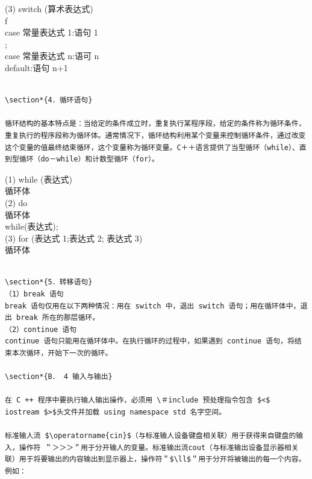 \documentclass[10pt]{article}
\begin{document}
(3) switch (算术表达式)\\
f\\
case 常量表达式 1:语句 1\\
;\\
case 常量表达式 n:语可 n\\
default:语句 n+1

\begin{verbatim}

\section*{4．循环语句}

循环结构的基本特点是：当给定的条件成立时，重复执行某程序段，给定的条件称为循环条件，重复执行的程序段称为循环体。通常情况下，循环结构利用某个变量来控制循环条件，通过改变这个变量的值最终结束循环，这个变量称为循环变量。C＋＋语言提供了当型循环（while）、直到型循环（do－while）和计数型循环（for）。
\end{verbatim}

(1) while (表达式)\\
循环体\\
(2) do\\
循环体\\
while(表达式);\\
(3) for (表达式 1;表达式 2; 表达式 3)\\
循环体

\begin{verbatim}

\section*{5．转移语句}
（1）break 语句
break 语句仅用在以下两种情况：用在 switch 中，退出 switch 语句；用在循环体中，退出 break 所在的那层循环。
（2）continue 语句
continue 语句只能用在循环体中。在执行循环的过程中，如果遇到 continue 语句，将结束本次循环，开始下一次的循环。

\section*{B． 4 输入与输出}

在 C ++ 程序中要执行输人输出操作，必须用 \＃include 预处理指令包含 $<$ iostream $>$头文件并加载 using namespace std 名字空间。

标准输人流 $\operatorname{cin}$（与标准输人设备键盘相关联）用于获得来自键盘的输入，操作符 ＂＞＞＞＂用于分开输人的变量。标准输出流cout（与标准输出设备显示器相关联）用于将要输出的内容输出到显示器上，操作符＂$\ll$＂用于分开将被输出的每一个内容。例如：
\end{verbatim}
\end{document}
